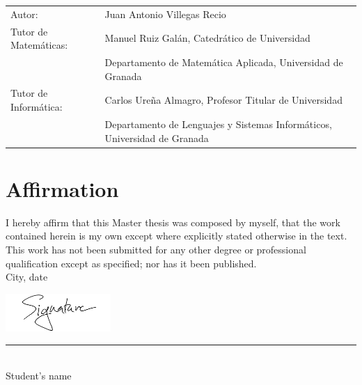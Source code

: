 \documentclass[11pt]{report}
\begin{document}
\begin{titlepage}
	\begin{table}[h!]
		\begin{footnotesize} \sffamily
			\begin{tabular}{p{}p{}}
				Autor: & Juan Antonio Villegas Recio \\
				Tutor de Matemáticas:    & Manuel Ruiz Galán, Catedrático de Universidad\\
				& Departamento de Matemática Aplicada, Universidad de Granada \\
				Tutor de Informática:      & Carlos Ureña Almagro, Profesor Titular de Universidad \\
				& Departamento de Lenguajes y Sistemas Informáticos, Universidad de Granada
			\end{tabular}
		\end{footnotesize}
	\end{table}
	
\end{titlepage}

\newpage

\chapter*{Affirmation}


I hereby affirm that this Master thesis was composed by myself, that the work contained herein is my own except where explicitly stated otherwise in the text. This work has not been submitted for any other degree or professional qualification except as specified; nor has it been published. \\
\newline
City, date

\vspace{0cm}
\noindent\includegraphics[width=0.3\textwidth]{img/mysignature.png}

\vspace*{-1.1cm}
\noindent \rule{0.3\textwidth}{.3pt}\\
\vspace{0.3cm}
\noindent \large{Student's name}        %


\end{document}
